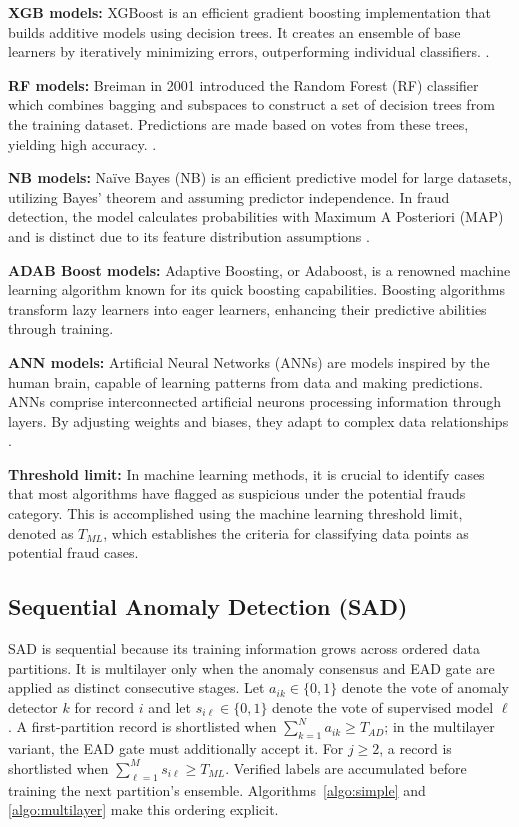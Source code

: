 \documentclass[12pt]{article}
\begin{document}
    \textbf{\small XGB models:}
XGBoost is an efficient gradient boosting implementation that
builds additive models using decision trees. It creates an
ensemble of base learners by iteratively minimizing errors,
outperforming individual classifiers. \cite{A57}.

    \textbf{\small RF models:}
Breiman in 2001 introduced the Random Forest (RF) classifier which
combines bagging and subspaces to construct a set of decision
trees from the training dataset. Predictions are made based on
votes from these trees, yielding high accuracy.
\cite{A52}.

\textbf{\small NB models:} Na\"ive Bayes (NB) is an efficient
predictive model for large datasets, utilizing Bayes' theorem and
assuming predictor independence. In fraud detection, the model
calculates probabilities with Maximum A Posteriori (MAP) and is
distinct due to its feature distribution assumptions \cite{A52}.

    \textbf{\small ADAB Boost models:}
Adaptive Boosting, or Adaboost, is a renowned machine learning
algorithm known for its quick boosting capabilities. Boosting
algorithms transform lazy learners into eager learners, enhancing
their predictive abilities through training\cite{A52}.

    \textbf{\small ANN models:}
Artificial Neural Networks (ANNs) are models inspired by the human
brain, capable of learning patterns from data and making
predictions. ANNs comprise interconnected artificial neurons
processing information through layers. By adjusting weights and
biases, they adapt to complex data relationships \cite{A52}.


    \textbf{\small Threshold limit:}
In machine learning methods, it is crucial to identify cases that
most algorithms have flagged as suspicious under the potential
frauds category. This is accomplished using the machine learning
threshold limit, denoted as $T_{ML}$, which establishes the
criteria for classifying data points as potential fraud cases.

\subsection{Sequential Anomaly Detection (SAD)}\label{SSC:SAD}
SAD is sequential because its training information grows across ordered data
partitions. It is multilayer only when the anomaly consensus and EAD gate are
applied as distinct consecutive stages. Let $a_{ik}\in\{0,1\}$ denote the vote
of anomaly detector $k$ for record $i$ and let $s_{i\ell}\in\{0,1\}$ denote
the vote of supervised model $\ell$. A first-partition record is shortlisted
when $\sum_{k=1}^{N}a_{ik}\geq T_{AD}$; in the multilayer variant, the EAD gate
must additionally accept it. For $j\geq2$, a record is shortlisted when
$\sum_{\ell=1}^{M}s_{i\ell}\geq T_{ML}$. Verified labels are accumulated before
training the next partition's ensemble. Algorithms~\ref{algo:simple} and
\ref{algo:multilayer} make this ordering explicit.
\end{document}
